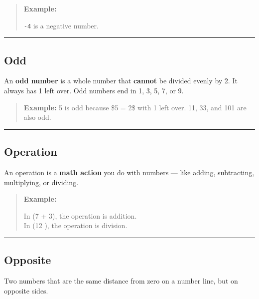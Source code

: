 \documentclass[
  letterpaper,
  DIV=11,
  numbers=noendperiod]{scrreprt}
\begin{document}
\begin{quote}
\textbf{Example:}

\texttt{-4} is a negative number.
\end{quote}

\begin{center}\rule{0.5\linewidth}{0.5pt}\end{center}

\subsection*{Odd}\label{glossary-odd}

An \textbf{odd number} is a whole number that \textbf{cannot} be divided
evenly by 2. It always has 1 left over. Odd numbers end in 1, 3, 5, 7,
or 9.

\begin{quote}
\textbf{Example:} 5 is odd because \$5  = 2\$ with 1 left over.
11, 33, and 101 are also odd.
\end{quote}

\begin{center}\rule{0.5\linewidth}{0.5pt}\end{center}

\subsection*{Operation}\label{glossary-operation}

An operation is a \textbf{math action} you do with numbers --- like
adding, subtracting, multiplying, or dividing.

\begin{quote}
\textbf{Example:}

In (7 + 3), the operation is addition.\\
In (12 ), the operation is division.
\end{quote}

\begin{center}\rule{0.5\linewidth}{0.5pt}\end{center}

\subsection*{Opposite}\label{glossary-opposite}

Two numbers that are the same distance from zero on a number line, but
on opposite sides.
\end{document}
